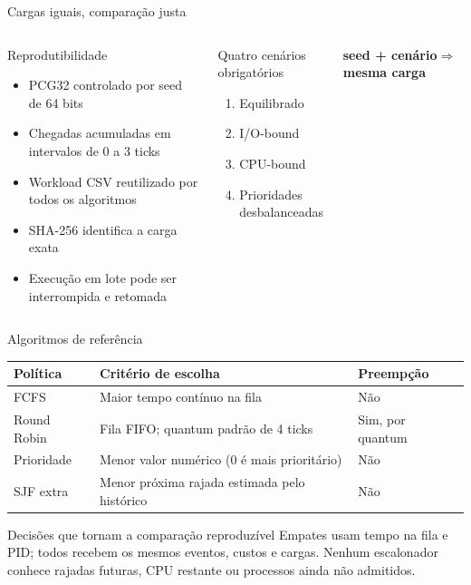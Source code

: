 \documentclass[aspectratio=169,11pt]{beamer}
\begin{document}
\begin{frame}{Cargas iguais, comparação justa}
  \begin{columns}[T,onlytextwidth]
      \begin{block}{Reprodutibilidade}
        \begin{itemize}
          \item PCG32 controlado por seed de 64 bits
          \item Chegadas acumuladas em intervalos de 0 a 3 ticks
          \item Workload CSV reutilizado por todos os algoritmos
          \item SHA-256 identifica a carga exata
          \item Execução em lote pode ser interrompida e retomada
        \end{itemize}
      \end{block}
      \begin{block}{Quatro cenários obrigatórios}
        \begin{enumerate}
          \item Equilibrado
          \item I/O-bound
          \item CPU-bound
          \item Prioridades desbalanceadas
        \end{enumerate}
      \end{block}
      \centering
      \textbf{seed + cenário}\quad$\Longrightarrow$\quad\textbf{mesma carga}
  \end{columns}
\end{frame}

\begin{frame}{Algoritmos de referência}
  \small
  \begin{tabular}{@{}p{}p{}p{}@{}}
    \toprule
    \textbf{Política} & \textbf{Critério de escolha} & \textbf{Preempção} \\
    \midrule
    FCFS & Maior tempo contínuo na fila & Não \\
    Round Robin & Fila FIFO; quantum padrão de 4 ticks & Sim, por quantum \\
    Prioridade & Menor valor numérico (0 é mais prioritário) & Não \\
    SJF extra & Menor próxima rajada estimada pelo histórico & Não \\
    \bottomrule
  \end{tabular}
  \vspace{1em}
  \begin{block}{Decisões que tornam a comparação reproduzível}
    Empates usam tempo na fila e PID; todos recebem os mesmos eventos, custos e cargas. Nenhum escalonador conhece rajadas futuras, CPU restante ou processos ainda não admitidos.
  \end{block}
\end{frame}
\end{document}
